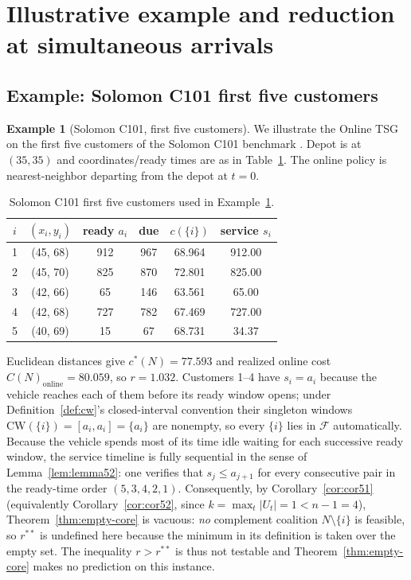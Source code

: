 \documentclass[11pt]{article}
\newcommand{\F}{\mathcal{F}}
\newcommand{\CW}{\mathrm{CW}}
\newcommand{\cstar}{c^{\ast}}
\theoremstyle{plain}
\theoremstyle{definition}
\newtheorem{example}[theorem]{Example}
\theoremstyle{remark}
\begin{document}
\section{Illustrative example and reduction at simultaneous arrivals}
\label{app:example-reduction}

\subsection{Example: Solomon C101 first five customers}

\begin{example}[Solomon C101, first five customers]
\label{ex:solomon}
We illustrate the Online TSG on the first five customers of the Solomon C101 benchmark \citep{solomon1987benchmarks}. Depot is at $(35, 35)$ and coordinates/ready times are as in Table~\ref{tab:solomon}. The online policy is nearest-neighbor departing from the depot at $t=0$.

\begin{table}[h]
\centering
\caption{Solomon C101 first five customers used in Example~\ref{ex:solomon}.}
\label{tab:solomon}
\small
\begin{tabular}{@{}cccccc@{}}
\toprule
$i$ & $(x_i, y_i)$ & ready $a_i$ & due & $c(\{i\})$ & service $s_i$ \\
\midrule
1 & (45, 68) & 912 & 967 & 68.964 & 912.00 \\
2 & (45, 70) & 825 & 870 & 72.801 & 825.00 \\
3 & (42, 66) &  65 & 146 & 63.561 &  65.00 \\
4 & (42, 68) & 727 & 782 & 67.469 & 727.00 \\
5 & (40, 69) &  15 &  67 & 68.731 &  34.37 \\
\bottomrule
\end{tabular}
\end{table}

Euclidean distances give $\cstar(N)=77.593$ and realized online cost $C(N)_{\text{online}}=80.059$, so $r = 1.032$. Customers 1--4 have $s_i=a_i$ because the vehicle reaches each of them before its ready window opens; under Definition~\ref{def:cw}'s closed-interval convention their singleton windows $\CW(\{i\})=[a_i,a_i]=\{a_i\}$ are nonempty, so every $\{i\}$ lies in $\F$ automatically. Because the vehicle spends most of its time idle waiting for each successive ready window, the service timeline is fully sequential in the sense of Lemma~\ref{lem:lemma52}: one verifies that $s_j \le a_{j+1}$ for every consecutive pair in the ready-time order $(5,3,4,2,1)$. Consequently, by Corollary~\ref{cor:cor51} (equivalently Corollary~\ref{cor:cor52}, since $k = \max_t|U_t| = 1 < n-1=4$), Theorem~\ref{thm:empty-core} is vacuous: \emph{no} complement coalition $N\setminus\{i\}$ is feasible, so $r^{\ast\ast}$ is undefined here because the minimum in its definition is taken over the empty set. The inequality $r > r^{\ast\ast}$ is thus not testable and Theorem~\ref{thm:empty-core} makes no prediction on this instance.


\end{example}
\end{document}
